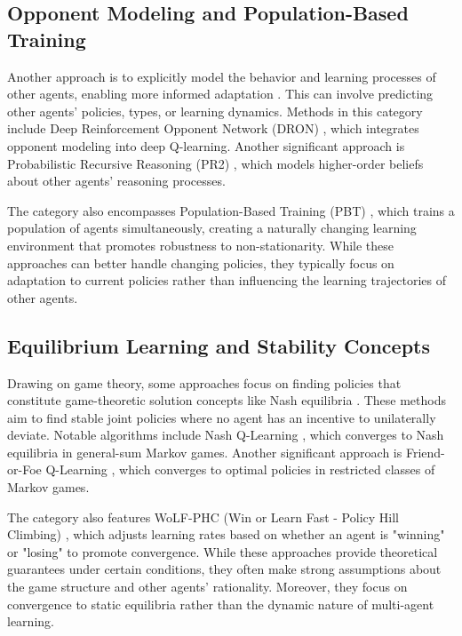 \documentclass[a4paper,12pt]{report}
\begin{document}
\subsection{Opponent Modeling and Population-Based Training}
Another approach is to explicitly model the behavior and learning processes of other agents, enabling more informed adaptation \cite{albrecht2018autonomous, he2016opponent}. This can involve predicting other agents' policies, types, or learning dynamics. Methods in this category include Deep Reinforcement Opponent Network (DRON) \cite{he2016opponent}, which integrates opponent modeling into deep Q-learning. Another significant approach is Probabilistic Recursive Reasoning (PR2) \cite{wen2019probabilistic}, which models higher-order beliefs about other agents' reasoning processes.

The category also encompasses Population-Based Training (PBT) \cite{jaderberg2019human}, which trains a population of agents simultaneously, creating a naturally changing learning environment that promotes robustness to non-stationarity. While these approaches can better handle changing policies, they typically focus on adaptation to current policies rather than influencing the learning trajectories of other agents.

\subsection{Equilibrium Learning and Stability Concepts}
Drawing on game theory, some approaches focus on finding policies that constitute game-theoretic solution concepts like Nash equilibria \cite{bowling2005convergence, hu2003nash, littman2001friend}. These methods aim to find stable joint policies where no agent has an incentive to unilaterally deviate. Notable algorithms include Nash Q-Learning \cite{hu2003nash}, which converges to Nash equilibria in general-sum Markov games. Another significant approach is Friend-or-Foe Q-Learning \cite{littman2001friend}, which converges to optimal policies in restricted classes of Markov games.

The category also features WoLF-PHC (Win or Learn Fast - Policy Hill Climbing) \cite{bowling2002multiagent}, which adjusts learning rates based on whether an agent is "winning" or "losing" to promote convergence. While these approaches provide theoretical guarantees under certain conditions, they often make strong assumptions about the game structure and other agents' rationality. Moreover, they focus on convergence to static equilibria rather than the dynamic nature of multi-agent learning.
\end{document}
